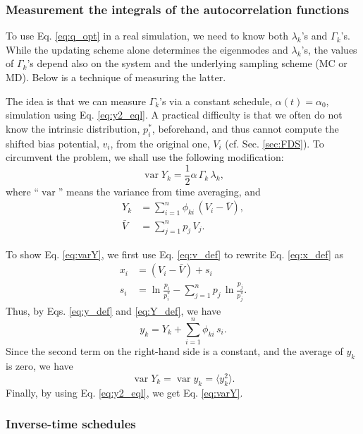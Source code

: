 \documentclass[reprint, floatfix]{revtex4-1}
\begin{document}
\subsubsection{\label{sec:measure_gamma}
Measurement the integrals
of the autocorrelation functions}



To use Eq. \eqref{eq:q_opt} in a real simulation,
we need to know both $\lambda_k$'s and $\Gamma_k$'s.
%
While the updating scheme alone
determines the eigenmodes and $\lambda_k$'s,
the values of $\Gamma_k$'s depend also on the system
and the underlying sampling scheme (MC or MD).
%
Below is a technique of measuring the latter.

The idea is that we can measure $\Gamma_k$'s
via a constant schedule, $\alpha(t) = \alpha_0$,
simulation using Eq. \eqref{eq:y2_eql}.
%
A practical difficulty is that
we often do not know the intrinsic distribution, $p^*_i$,
beforehand, and thus cannot compute
the shifted bias potential, $v_i$,
from the original one, $V_i$
(cf. Sec. \ref{sec:FDS}).
%
To circumvent the problem, we shall use
the following modification:
%
\begin{equation}
\operatorname{var} Y_k
=
\frac{1}{2}
\alpha \, \Gamma_k \, \lambda_k,
\label{eq:varY}
\end{equation}
%
where
``$\operatorname{var}$''
means the variance from time averaging,
and
%
\begin{align}
Y_k
&=
\sum_{ i = 1 }^n
  \phi_{k i} \, (V_i - \bar V),
\label{eq:Y_def}
\\
\bar V
&=
\sum_{ j = 1 }^n p_j \, V_j.
\end{align}

To show Eq. \eqref{eq:varY},
we first use Eq. \eqref{eq:v_def}
to rewrite Eq. \eqref{eq:x_def}
as
$$
\begin{aligned}
x_i
&=
(V_i - \bar V) + s_i
\\
s_i
&=
\ln \frac{ p_i } { p^*_i }
-
\sum_{ j = 1 }^n
  p_j \, \ln \frac{ p_j } { p^*_j }.
\end{aligned}
$$
Thus, by Eqs. \eqref{eq:y_def} and \eqref{eq:Y_def},
we have
$$
y_k = Y_k + \sum_{i = 1}^n \phi_{k i} \, s_i.
$$
Since the second term on the right-hand side
is a constant, and the average of $y_k$ is zero,
we have
$$
\operatorname{var} Y_k
=
\operatorname{var} y_k
=
\langle y_k^2 \rangle.
$$
Finally, by using Eq. \eqref{eq:y2_eql},
we get Eq. \eqref{eq:varY}.



\subsubsection{\label{sec:invt_alpha}
Inverse-time schedules}
\end{document}

